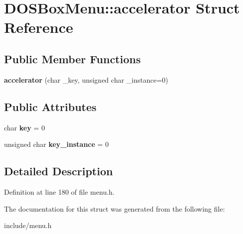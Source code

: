 \hypertarget{structDOSBoxMenu_1_1accelerator}{\section{D\-O\-S\-Box\-Menu\-:\-:accelerator Struct Reference}
\label{structDOSBoxMenu_1_1accelerator}
}
\subsection*{Public Member Functions}
\begin{DoxyCompactItemize}
\item 
\hypertarget{structDOSBoxMenu_1_1accelerator_aa61f9898a302bd155bfe72cd04a93d33}{{\bfseries accelerator} (char \-\_\-key, unsigned char \-\_\-instance=0)}\label{structDOSBoxMenu_1_1accelerator_aa61f9898a302bd155bfe72cd04a93d33}

\end{DoxyCompactItemize}
\subsection*{Public Attributes}
\begin{DoxyCompactItemize}
\item 
\hypertarget{structDOSBoxMenu_1_1accelerator_a84a5ea4d13efd91652a5030c4fa354f2}{char {\bfseries key} = 0}\label{structDOSBoxMenu_1_1accelerator_a84a5ea4d13efd91652a5030c4fa354f2}

\item 
\hypertarget{structDOSBoxMenu_1_1accelerator_a14373aa330474bfbe946ad600aadc3b2}{unsigned char {\bfseries key\-\_\-instance} = 0}\label{structDOSBoxMenu_1_1accelerator_a14373aa330474bfbe946ad600aadc3b2}

\end{DoxyCompactItemize}


\subsection{Detailed Description}


Definition at line 180 of file menu.\-h.



The documentation for this struct was generated from the following file\-:\begin{DoxyCompactItemize}
\item 
include/menu.\-h\end{DoxyCompactItemize}
